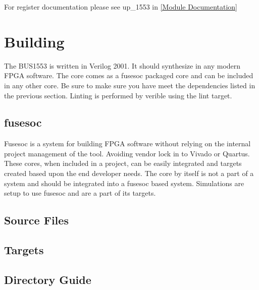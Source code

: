 For register documentation please see up\_1553 in \ref{Module Documentation}

\section{Building}

\par
The BUS1553 is written in Verilog 2001. It should synthesize in any modern FPGA software. The core comes as a fusesoc packaged core and can be included in any other core. Be sure to make sure you have meet the dependencies listed in the previous section. Linting is performed by verible using the lint target.

\subsection{fusesoc}
\par
Fusesoc is a system for building FPGA software without relying on the internal project management of the tool. Avoiding vendor lock in to Vivado or Quartus.
These cores, when included in a project, can be easily integrated and targets created based upon the end developer needs. The core by itself is not a part of
a system and should be integrated into a fusesoc based system. Simulations are setup to use fusesoc and are a part of its targets.

\subsection{Source Files}







\subsection{Targets}







\subsection{Directory Guide}

